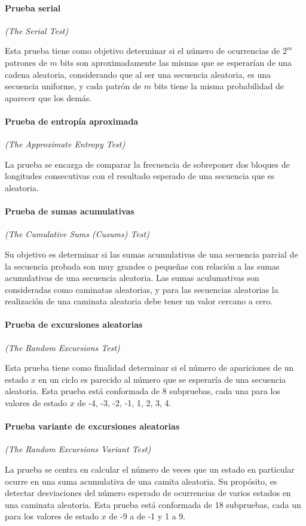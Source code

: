 \paragraph{Prueba serial} %
\textit{(The Serial Test)}

Esta prueba tiene como objetivo determinar si el número de ocurrencias de
$2^m$ patrones de $m$ bits son aproximadamente las mismas que se esperarían
de una cadena aleatoria, considerando que al ser una secuencia aleatoria,
es una secuencia uniforme, y cada patrón de $m$ bits tiene la misma
probabilidad de aparecer que los demás.

\paragraph{Prueba de entropía aproximada} %
\textit{(The Approximate Entropy Test)}

La prueba se encarga de comparar la frecuencia de sobreponer dos bloques de
longitudes consecutivas con el resultado esperado de una secuencia que es
aleatoria.

\paragraph{Prueba de sumas acumulativas} %
\textit{(The Cumulative Sums (Cusums) Test)}

Su objetivo es determinar si las sumas acumulativas de una secuencia parcial
de la secuencia probada son muy grandes o pequeñas con relación a las sumas
acumulativas de una secuencia aleatoria. Las sumas aculumativas son
consideradas como caminatas aleatorias, y para las secuencias aleatorias
la realización de una caminata aleatoria debe tener un valor cercano a cero.

\paragraph{Prueba de excursiones aleatorias} %
\textit{(The Random Excursions Test)}

Esta prueba tiene como finalidad determinar si el número de apariciones de un
estado $x$ en un ciclo es parecido al número que se esperaría de una secuencia
aleatoria. Esta prueba está conformada de 8 subpruebas, cada una para los
valores de estado $x$ de -4, -3, -2, -1, 1, 2, 3, 4.

\paragraph{Prueba variante de excursiones aleatorias} %
\textit{(The Random Excursions Variant Test)}

La prueba se centra en calcular el número de veces que un estado en particular
ocurre en una suma acumulativa de una camita aleatoria. Su propósito, es
detectar desviaciones del número esperado de ocurrencias de varios estados
en una caminata aleatoria. Esta prueba está conformada de 18 subpruebas, cada
un para los valores de estado $x$ de -9 a de -1 y  1 a 9.
